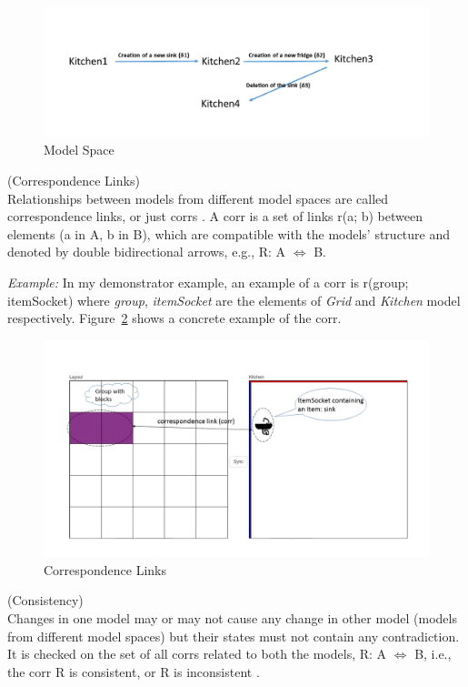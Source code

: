 \begin{figure}
	\includegraphics[width=1\textwidth]{figures/Model_Space}
	\caption{Model Space}
	\label{fig:Model_Space}
\end{figure}

\begin{defn}\label{defCorrespondenceLinks } (Correspondence Links)\\
Relationships between models from different model spaces are called correspondence links, or just corrs \cite{benchmarx-reload}. A corr is a set of links  r(a; b) between elements (a in A, b in B), which are compatible with the models' structure and denoted by double bidirectional arrows, e.g., R: A $\Longleftrightarrow$ B. 
\end{defn}

\textit{Example:} In my demonstrator example, an example of a corr is r(group; itemSocket) where \textit{group}, \textit{itemSocket} are the elements of \textit{Grid} and \textit{Kitchen} model respectively. Figure~\ref{fig:Correspondence_Links} shows a concrete example of the corr.\\
\begin{figure}
	\includegraphics[width=1\textwidth]{figures/Corr}
	\caption{Correspondence Links}
	\label{fig:Correspondence_Links}
\end{figure}

\begin{defn}\label{defConsistency } (Consistency)\\
Changes in one model may or may not cause any change in other model (models from different model spaces) but their states must not contain any contradiction. It is checked on the set of all corrs related to both the models, R: A $\Longleftrightarrow$ B, i.e., the corr R is consistent, or R is inconsistent \cite{benchmarx-reload}.
\end{defn} 

